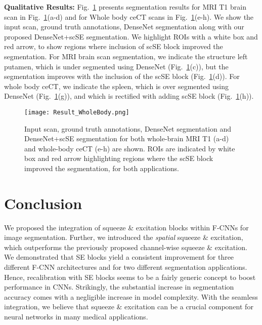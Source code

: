 \documentclass{llncs}
\begin{document}
\noindent
\textbf{Qualitative Results: }
Fig.~\ref{fig:result}  presents segmentation results for MRI T1 brain scan in Fig.~\ref{fig:result}(a-d) and for Whole body ceCT scans in Fig.~\ref{fig:result}(e-h). We show the input scan, ground truth annotations, DenseNet segmentation along with our proposed DenseNet+scSE segmentation. We highlight ROIs with a white box and red arrow, to show regions where inclusion of scSE block improved the segmentation. For MRI brain scan segmentation, we indicate the structure left putamen, which is under segmented using  DenseNet (Fig.~\ref{fig:result}(c)), but the segmentation improves with the inclusion of the scSE block (Fig.~\ref{fig:result}(d)). For whole body ceCT, we indicate the  spleen, which is over segmented using DenseNet (Fig.~\ref{fig:result}(g)), and which is rectified with adding scSE block (Fig.~\ref{fig:result}(h)).

\begin{figure}[t]
\centering
\texttt{[image: Result\_WholeBody.png]}
\vspace{-2mm}
\caption{Input scan, ground truth annotations, DenseNet segmentation and DenseNet+scSE segmentation for both whole-brain MRI T1 (a-d) and whole-body ceCT (e-h) are shown.  ROIs are indicated by white box and red arrow highlighting regions where the scSE block improved the segmentation, for both applications.}
\label{fig:result}
\end{figure}

\vspace{-2mm}
\section{Conclusion}
\label{sec:conc}
\vspace{-2mm}
We proposed the integration of squeeze \& excitation  blocks within F-CNNs for image segmentation. Further, we introduced the \emph{spatial} squeeze \& excitation, which outperforms the previously proposed channel-wise squeeze \& excitation. We demonstrated that SE blocks yield a consistent improvement for three different F-CNN architectures and for two different segmentation applications. Hence, recalibration with SE blocks seems to be a fairly generic concept to boost performance in CNNs. Strikingly, the substantial increase in segmentation accuracy comes with a negligible increase in model complexity. With the seamless integration, we believe that squeeze \& excitation can be a crucial component for neural networks in many medical applications. 
\end{document}
